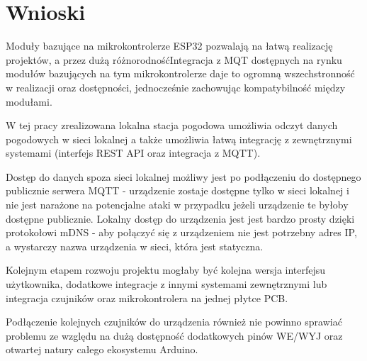 \documentclass[12pt,a4paper]{article}
\begin{document}



\section{Wnioski}
Moduły bazujące na mikrokontrolerze ESP32 pozwalają na łatwą realizację projektów, a przez dużą różnorodnośćIntegracja z MQT
dostępnych na rynku modułów bazujących na tym mikrokontrolerze daje to ogromną wszechstronność w realizacji oraz dostępności, jednocześnie zachowując kompatybilność między modułami.

W tej pracy zrealizowana lokalna stacja pogodowa umożliwia odczyt danych pogodowych w sieci lokalnej a także umożliwia łatwą integrację z zewnętrznymi systemami (interfejs REST API oraz integracja z MQTT).

Dostęp do danych spoza sieci lokalnej możliwy jest po podłączeniu do dostępnego publicznie serwera MQTT - urządzenie zostaje dostępne tylko w sieci lokalnej i nie jest narażone na potencjalne ataki w przypadku jeżeli urządzenie te byłoby dostępne publicznie. Lokalny dostęp do urządzenia jest jest bardzo prosty dzięki protokołowi mDNS - aby połączyć się z urządzeniem nie jest potrzebny adres IP, a wystarczy nazwa urządzenia w sieci, która jest statyczna.

Kolejnym etapem rozwoju projektu mogłaby być kolejna wersja interfejsu użytkownika, dodatkowe integracje z innymi systemami zewnętrznymi lub integracja czujników oraz mikrokontrolera na jednej płytce PCB.

Podłączenie kolejnych czujników do urządzenia również nie powinno sprawiać problemu ze względu na dużą dostępność dodatkowych pinów WE/WYJ oraz
otwartej natury całego ekosystemu Arduino. 
\end{document}
